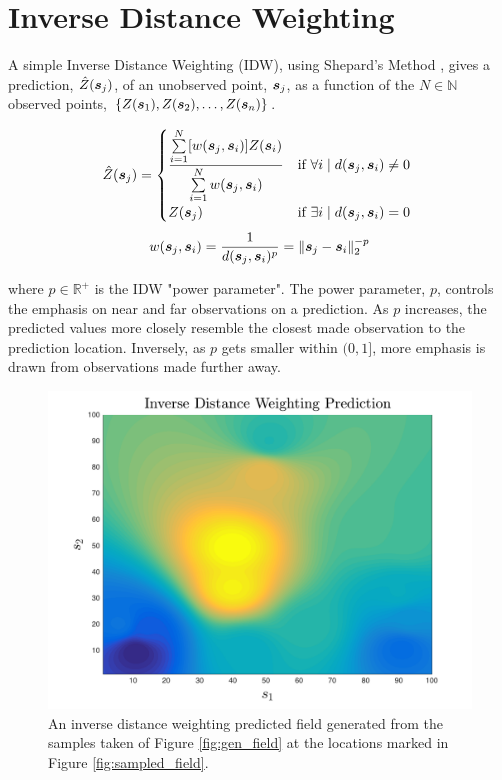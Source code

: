 \documentclass[11pt]{ucthesis}
\newcommand{\vect}[1]{{\it{\boldsymbol{#1}}}}
\begin{document}
\section{Inverse Distance Weighting} \label{sec:idw_intro}
A simple Inverse Distance Weighting (IDW), using Shepard's Method \cite{shepard:idw}, gives a prediction, $\hat{Z}(\vect{s}_j)$, of an unobserved point, $\vect{s}_j$, as a function of the $N \in \mathbb{N}$ observed points, $\{Z(\vect{s}_1), Z(\vect{s}_2), \hdots, Z(\vect{s}_n) \}$.

\begin{equation}
	\hat{Z}(\vect{s}_j)=\begin{cases}
			\dfrac{\sum\limits_{i=1}^N [w(\vect{s}_j, \vect{s}_i)] Z(\vect{s}_i) }{\sum\limits_{i=1}^{N} w(\vect{s}_j, \vect{s}_i)} & \text{if}\ \forall i \mid d(\vect{s}_j,\vect{s}_i) \neq 0\ \\
			Z(\vect{s}_j) & \text{if}\ \exists i \mid d(\vect{s}_j,\vect{s}_i)=0\\
		\end{cases}
\end{equation}
\begin{equation}
	w(\vect{s}_j, \vect{s}_i)=\frac{1}{d(\vect{s}_j,\vect{s}_{i})^{p}}=\|\vect{s}_j-\vect{s}_i\|_{2}^{-p}
\end{equation}

where $p \in \mathbb{R}^{+}$ is the IDW "power parameter". The power parameter, $p$, controls the emphasis on near and far observations on a prediction. As $p$ increases, the predicted values more closely resemble the closest made observation to the prediction location. Inversely, as $p$ gets smaller within $(0, 1]$, more emphasis is drawn from observations made further away.\\

\begin{figure}[ht!]
    \centering
    \includegraphics[width=0.8\linewidth]{figures/idw_predicted_field.png}
    \caption{An inverse distance weighting predicted field generated from the samples taken of Figure \ref{fig:gen_field} at the locations marked in Figure \ref{fig:sampled_field}.}
    \label{fig:idw_field}
\end{figure}
\end{document}
